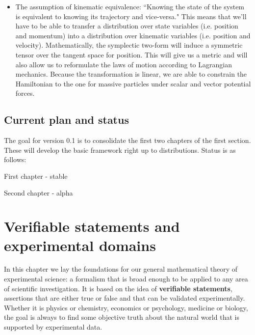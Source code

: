 \documentclass[11pt,letterpaper,fleqn]{memoir} %
\begin{document}
\begin{itemize}
	\item The assumption of kinematic equivalence: ``Knowing the state of the system is equivalent to knowing its trajectory and vice-versa." This means that we'll have to be able to transfer a distribution over state variables (i.e. position and momentum) into a distribution over kinematic variables (i.e. position and velocity). Mathematically, the symplectic two-form will induce a symmetric tensor over the tangent space for position. This will give us a metric and will also allow us to reformulate the laws of motion according to Lagrangian mechanics. Because the transformation is linear, we are able to constrain the Hamiltonian to the one for massive particles under scalar and vector potential forces.
\end{itemize}

\section*{Current plan and status}

The goal for version 0.1 is to consolidate the first two chapters of the first section. These will develop the basic framework right up to distributions. Status is as follows:

\begin{description}
	\item First chapter - stable
	\item Second chapter - alpha
\end{description}



\cleardoublepage %

\tableofcontents* %

\cleardoublepage %


\mainmatter

\chapter{Verifiable statements and experimental domains}

In this chapter we lay the foundations for our general mathematical theory of experimental science: a formalism that is broad enough to be applied to any area of scientific investigation. It is based on the idea of \textbf{verifiable statements}, assertions that are either true or false and that can be validated experimentally. Whether it is physics or chemistry, economics or psychology, medicine or biology, the goal is always to find some objective truth about the natural world that is supported by experimental data.
\end{document}

